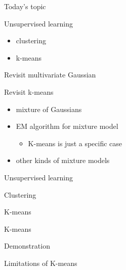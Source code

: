 \documentclass[11pt,ignorenonframetext,aspectratio=169]{beamer}
\providecommand{\tightlist}{%
  \setlength{\itemsep}{0pt}\setlength{\parskip}{0pt}}
\begin{document}
\begin{frame}{Today's topic}
\protect\hypertarget{todays-topic}{}

Unsupervised learning

\begin{itemize}
\tightlist
\item
  clustering
\item
  k-means
\end{itemize}

Revisit multivariate Gaussian

Revisit k-means

\begin{itemize}
\tightlist
\item
  mixture of Gaussians
\item
  EM algorithm for mixture model

  \begin{itemize}
  \tightlist
  \item
    K-means is just a specific case
  \end{itemize}
\item
  other kinds of mixture models
\end{itemize}

\end{frame}

\begin{frame}{Unsupervised learning}
\protect\hypertarget{unsupervised-learning}{}

\end{frame}

\begin{frame}{Clustering}
\protect\hypertarget{clustering}{}

\end{frame}

\begin{frame}{K-means}
\protect\hypertarget{k-means}{}

\end{frame}

\begin{frame}{K-means}
\protect\hypertarget{k-means-1}{}

\end{frame}

\begin{frame}{Demonstration}
\protect\hypertarget{demonstration}{}

\end{frame}

\begin{frame}{Limitations of K-means}
\protect\hypertarget{limitations-of-k-means}{}

\end{frame}
\end{document}

